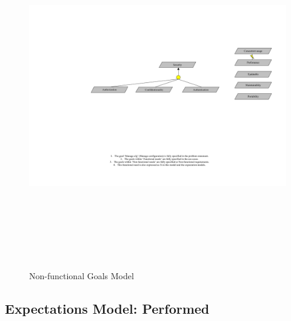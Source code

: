 \begin{figure}[htbp]
  \centering
  \includegraphics[angle=90,width=15cm,height=15cm]{"nonfunctionalGoals"}
  \caption{Non-functional Goals Model}
  \label{fig:nonfuncgoalmodel}
\end{figure}

\newpage
\subsection{Expectations Model: Performed}

